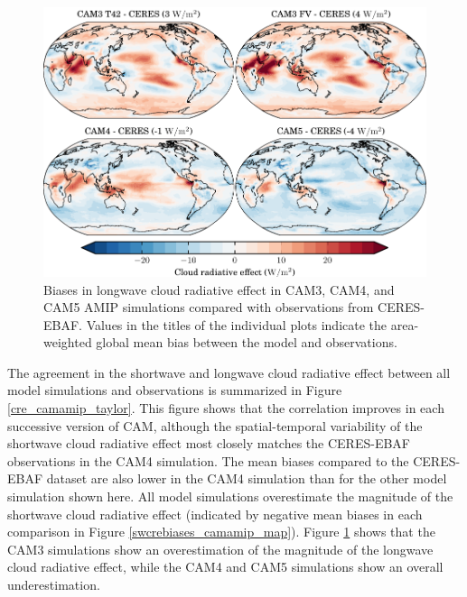 \begin{figure}
    \centering
    \includegraphics{../graphics/lwcrebiases_camamip_map.pdf}
    \caption[Biases in longwave cloud radiative effect in CAM4 and CAM5 AMIP simulations compared with observations from CERES-EBAF.]{Biases in longwave cloud radiative effect in CAM3, CAM4, and CAM5 AMIP simulations compared with observations from CERES-EBAF. Values in the titles of the individual plots indicate the area-weighted global mean bias between the model and observations.}
    \label{lwcrebiases_camamip_map}
\end{figure}

The agreement in the shortwave and longwave cloud radiative effect between all model simulations and observations is summarized in Figure \ref{cre_camamip_taylor}. This figure shows that the correlation improves in each successive version of CAM, although the spatial-temporal variability of the shortwave cloud radiative effect most closely matches the CERES-EBAF observations in the CAM4 simulation. The mean biases compared to the CERES-EBAF dataset are also lower in the CAM4 simulation than for the other model simulation shown here. All model simulations overestimate the magnitude of the shortwave cloud radiative effect (indicated by negative mean biases in each comparison in Figure \ref{swcrebiases_camamip_map}). Figure \ref{lwcrebiases_camamip_map} shows that the CAM3 simulations show an overestimation of the magnitude of the longwave cloud radiative effect, while the CAM4 and CAM5 simulations show an overall underestimation.

